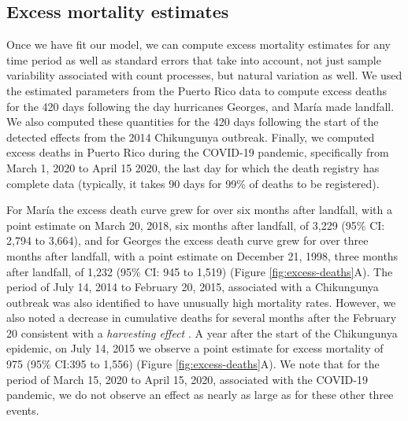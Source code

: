 \documentclass[11pt]{article}
\begin{document}
\subsection{Excess mortality estimates}
\label{subsec:excess-mortality}
Once we have fit our model, we can compute excess mortality estimates for any time period as well as standard errors that take into account, not just sample variability associated with count processes, but natural variation as well. We used the estimated parameters from the Puerto Rico data to compute excess deaths for the 420 days following the day hurricanes Georges, and Mar\'ia made landfall. We also computed these quantities for the 420 days following the start of the detected effects from the 2014 Chikungunya outbreak. Finally, we computed excess deaths in Puerto Rico during the COVID-19 pandemic, specifically from March 1, 2020 to April 15 2020, the last day for which the death registry has complete data (typically, it takes 90 days for 99\% of deaths to be registered). 

For Mar\'ia the excess death curve grew for over six months after landfall, with a point estimate on March 20, 2018, six months after landfall, of 3,229 (95\% CI: 2,794 to 3,664), and for Georges the excess death curve grew for over three months after landfall, with a point estimate on December 21, 1998, three months after landfall, of 1,232 (95\% CI: 945 to 1,519) (Figure \ref{fig:excess-deaths}A). The period of July 14, 2014 to February 20, 2015, associated with a Chikungunya outbreak was also identified to have unusually high mortality rates. However, we also noted a decrease in cumulative deaths for several months after the February 20 consistent with a \emph{harvesting effect} \cite{hajat2005mortality, dushoff2006mortality}. A year after the start of the Chikungunya epidemic, on July 14, 2015 we observe a point estimate for excess mortality of 975 (95\% CI:395 to 1,556) (Figure \ref{fig:excess-deaths}A). We note that for the period of March 15, 2020 to April 15, 2020, associated with the COVID-19 pandemic, we do not observe an effect as nearly as large as for these other three events.
\end{document}
